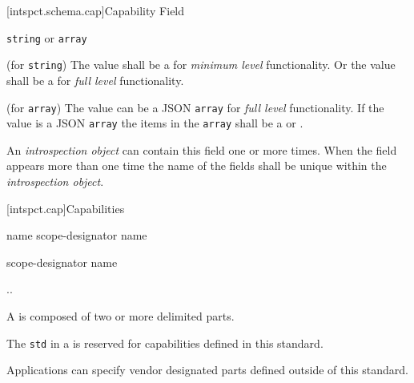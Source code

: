 [intspct.schema.cap]{Capability Field}

\begin{itemdescr}

	\pnum
	\fldname
	 

	\pnum
	\fldtype
	\verb|string| or \verb|array|

	\pnum
	\fldval (for \verb|string|)
	The value shall be a  for \emph{minimum level}
	functionality.
	Or the value shall be a  for \emph{full level}
	functionality.

	\pnum
	\fldval (for \verb|array|)
	The value can be a JSON \verb|array| for \emph{full level} functionality.
	If the value is a JSON \verb|array| the items in the \verb|array| shall be a
	 or .
	
	\pnum
	\flddesc
	An \emph{introspection object} can contain this field one or more times.
	When the field appears more than one time the name of the fields shall be
	unique within the \emph{introspection object}.
  
\end{itemdescr}

[intspct.cap]{Capabilities}

\pnum
\begin{ncbnf}

\br
	name scope-designator name 

\br
	scope-designator name 

\br
	\br
	 ..  \br
	 

\br
	 

\end{ncbnf}

\pnum
A  is composed of two or more
 delimited  parts.

\pnum
The  \verb|std| in a  is
reserved for capabilities defined in this standard.

\pnum
Applications can specify vendor designated  parts defined
outside of this standard.

